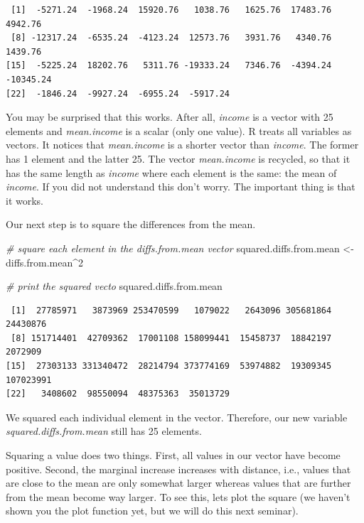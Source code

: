 \documentclass[]{book}
\newenvironment{Shaded}{\begin{snugshade}}{\end{snugshade}}
\newcommand{\DecValTok}[1]{\textcolor[rgb]{0.00,0.00,0.81}{#1}}
\newcommand{\StringTok}[1]{\textcolor[rgb]{0.31,0.60,0.02}{#1}}
\newcommand{\CommentTok}[1]{\textcolor[rgb]{0.56,0.35,0.01}{\textit{#1}}}
\newcommand{\OperatorTok}[1]{\textcolor[rgb]{0.81,0.36,0.00}{\textbf{#1}}}
\newcommand{\NormalTok}[1]{#1}
\theoremstyle{definition}
\theoremstyle{definition}
\theoremstyle{definition}
\theoremstyle{remark}
\begin{document}
\begin{verbatim}
 [1]  -5271.24  -1968.24  15920.76   1038.76   1625.76  17483.76   4942.76
 [8] -12317.24  -6535.24  -4123.24  12573.76   3931.76   4340.76   1439.76
[15]  -5225.24  18202.76   5311.76 -19333.24   7346.76  -4394.24 -10345.24
[22]  -1846.24  -9927.24  -6955.24  -5917.24
\end{verbatim}

You may be surprised that this works. After all, \emph{income} is a
vector with 25 elements and \emph{mean.income} is a scalar (only one
value). R treats all variables as vectors. It notices that
\emph{mean.income} is a shorter vector than \emph{income}. The former
has 1 element and the latter 25. The vector \emph{mean.income} is
recycled, so that it has the same length as \emph{income} where each
element is the same: the mean of \emph{income}. If you did not
understand this don't worry. The important thing is that it works.

Our next step is to square the differences from the mean.

\begin{Shaded}
\begin{Highlighting}[]
\CommentTok{# square each element in the diffs.from.mean vector}
\NormalTok{squared.diffs.from.mean <-}\StringTok{ }\NormalTok{diffs.from.mean}\OperatorTok{^}\DecValTok{2}

\CommentTok{# print the squared vecto}
\NormalTok{squared.diffs.from.mean}
\end{Highlighting}
\end{Shaded}

\begin{verbatim}
 [1]  27785971   3873969 253470599   1079022   2643096 305681864  24430876
 [8] 151714401  42709362  17001108 158099441  15458737  18842197   2072909
[15]  27303133 331340472  28214794 373774169  53974882  19309345 107023991
[22]   3408602  98550094  48375363  35013729
\end{verbatim}

We squared each individual element in the vector. Therefore, our new
variable \emph{squared.diffs.from.mean} still has 25 elements.

Squaring a value does two things. First, all values in our vector have
become positive. Second, the marginal increase increases with distance,
i.e., values that are close to the mean are only somewhat larger whereas
values that are further from the mean become way larger. To see this,
lets plot the square (we haven't shown you the plot function yet, but we
will do this next seminar).
\end{document}

